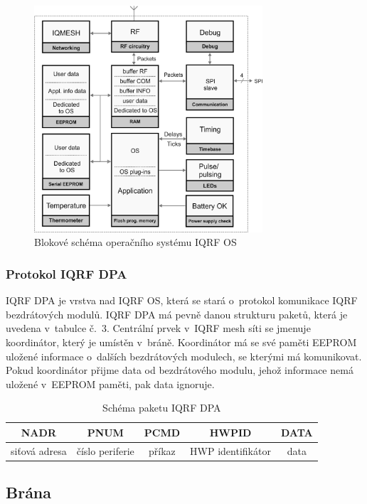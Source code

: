 \documentclass[12pt,a4paper,oneside]{article}
\begin{document}
\begin{figure}[H]
\centering
\label{fig:foto/iqrf-os}
\includegraphics[width = 85mm]{img/iqrf/os-blokove-schema.png}
\caption{Blokové schéma operačního systému IQRF OS}
\end{figure}

\newpage

\subsubsection{Protokol IQRF DPA}

IQRF DPA\cite{iqrf/dpa} je vrstva nad IQRF OS, která se stará o~protokol komunikace IQRF bezdrátových modulů. IQRF DPA má pevně danou strukturu paketů, která je uvedena v~tabulce č.~3. Centrální prvek v~IQRF mesh síti se jmenuje koordinátor, který je umístěn v~bráně. Koordinátor má se své paměti EEPROM uložené informace o~dalších bezdrátových modulech, se kterými má komunikovat. Pokud koordinátor přijme data od bezdrátového modulu, jehož informace nemá uložené v~EEPROM paměti, pak data ignoruje.

\begin{table}[H]
\centering
\begin{tabular}{|c|c|c|c|c|}
\hline
NADR & PNUM & PCMD & HWPID & DATA \\
\hline
siťová adresa & číslo periferie & příkaz & HWP\index[zkr]{HWP!Hardware profile|textit} identifikátor & data \\
\hline
\end{tabular}
\caption{Schéma paketu IQRF DPA}\label{table:iqrf/dpa}
\end{table}

\newpage

\subsection{Brána}
\end{document}
